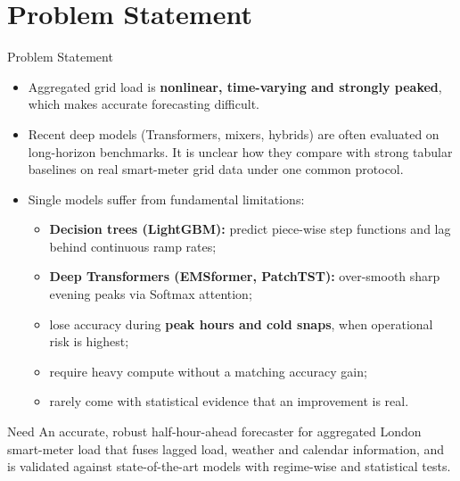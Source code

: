 \documentclass[aspectratio=169]{beamer}
\begin{document}
\section{Problem Statement}
\begin{frame}{Problem Statement}
  \begin{itemize}
    \item Aggregated grid load is \textbf{nonlinear, time-varying and strongly peaked}, which makes accurate forecasting difficult.
    \item Recent deep models (Transformers, mixers, hybrids) are often evaluated on long-horizon benchmarks. It is unclear how they compare with strong tabular baselines on real smart-meter grid data under one common protocol.
    \item Single models suffer from fundamental limitations:
    \begin{itemize}
      \item \textbf{Decision trees (LightGBM):} predict piece-wise step functions and lag behind continuous ramp rates;
      \item \textbf{Deep Transformers (EMSformer, PatchTST):} over-smooth sharp evening peaks via Softmax attention;
      \item lose accuracy during \textbf{peak hours and cold snaps}, when operational risk is highest;
      \item require heavy compute without a matching accuracy gain;
      \item rarely come with statistical evidence that an improvement is real.
    \end{itemize}
  \end{itemize}
  \vspace{2pt}
  \begin{alertblock}{Need}
    An accurate, robust half-hour-ahead forecaster for aggregated London smart-meter load that fuses lagged load, weather and calendar information, and is validated against state-of-the-art models with regime-wise and statistical tests.
  \end{alertblock}
\end{frame}

\end{document}
